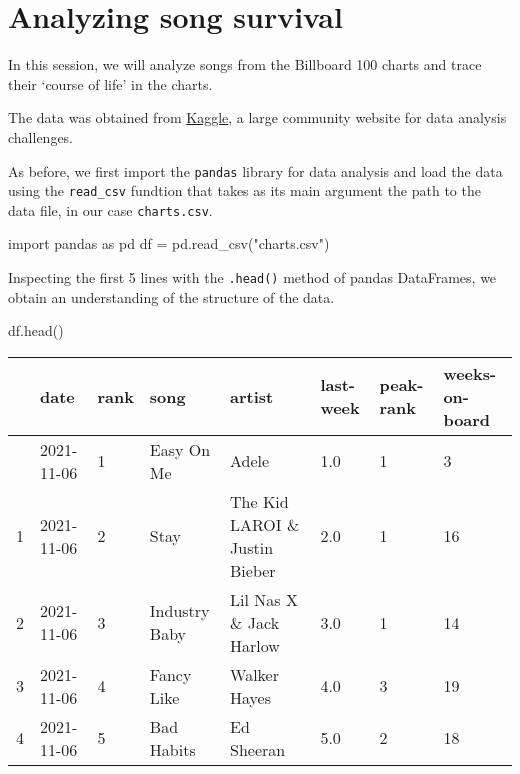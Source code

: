 \documentclass[
  a4paper,
]{scrbook}
\newenvironment{Shaded}{\begin{snugshade}}{\end{snugshade}}
\newcommand{\ImportTok}[1]{\textcolor[rgb]{0.00,0.46,0.62}{#1}}
\newcommand{\NormalTok}[1]{\textcolor[rgb]{0.00,0.23,0.31}{#1}}
\newcommand{\OperatorTok}[1]{\textcolor[rgb]{0.37,0.37,0.37}{#1}}
\newcommand{\StringTok}[1]{\textcolor[rgb]{0.13,0.47,0.30}{#1}}
\begin{document}
\chapter{Analyzing song survival}\label{analyzing-song-survival-1}

In this session, we will analyze songs from the Billboard 100 charts and
trace their `course of life' in the charts.

The data was obtained from
\href{https://www.kaggle.com/datasets/dhruvildave/billboard-the-hot-100-songs}{Kaggle},
a large community website for data analysis challenges.

As before, we first import the \texttt{pandas} library for data analysis
and load the data using the \texttt{read\_csv} fundtion that takes as
its main argument the path to the data file, in our case
\texttt{charts.csv}.

\begin{Shaded}
\begin{Highlighting}[]
\ImportTok{import}\NormalTok{ pandas }\ImportTok{as}\NormalTok{ pd}
\NormalTok{df }\OperatorTok{=}\NormalTok{ pd.read\_csv(}\StringTok{"charts.csv"}\NormalTok{)}
\end{Highlighting}
\end{Shaded}

Inspecting the first 5 lines with the \texttt{.head()} method of pandas
DataFrames, we obtain an understanding of the structure of the data.

\begin{Shaded}
\begin{Highlighting}[]
\NormalTok{df.head()}
\end{Highlighting}
\end{Shaded}

\begin{longtable}[]{@{}llllllll@{}}
\toprule\noalign{}
& date & rank & song & artist & last-week & peak-rank &
weeks-on-board \\
\midrule\noalign{}
\endhead
\bottomrule\noalign{}
\endlastfoot
0 & 2021-11-06 & 1 & Easy On Me & Adele & 1.0 & 1 & 3 \\
1 & 2021-11-06 & 2 & Stay & The Kid LAROI \& Justin Bieber & 2.0 & 1 &
16 \\
2 & 2021-11-06 & 3 & Industry Baby & Lil Nas X \& Jack Harlow & 3.0 & 1
& 14 \\
3 & 2021-11-06 & 4 & Fancy Like & Walker Hayes & 4.0 & 3 & 19 \\
4 & 2021-11-06 & 5 & Bad Habits & Ed Sheeran & 5.0 & 2 & 18 \\
\end{longtable}
\end{document}
